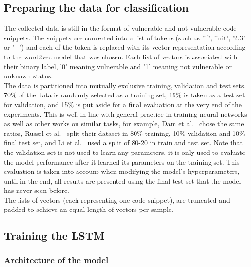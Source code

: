 \documentclass[
a4paper,
pagesize,
pdftex,
12pt,
twoside, %
BCOR=5mm, %
ngerman,
fleqn,
final,
]{scrartcl}
\begin{document}
	\subsection{Preparing the data for classification}
	The collected data is still in the format of vulnerable and not vulnerable code snippets. The snippets are converted into a list of tokens (such as 'if', 'init', '2.3' or '+') and each of the token is replaced with its vector representation according to the word2vec model that was chosen. Each list of vectors is associated with their binary label, '0' meaning vulnerable and '1' meaning not vulnerable or unknown status.\\
	The data is partitioned into mutually exclusive training, validation and test sets. 70\% of the data is randomly selected as a training set, 15\% is taken as a test set for validation, and 15\% is put aside for a final evaluation at the very end of the experiments. This is well in line with general practice in training neural networks as well as other works on similar tasks, for example, Dam et al.~\cite{Dam.2016} chose the same ratios, Russel et al.~\cite{Russell.2018} split their dataset in 80\% training, 10\% validation and 10\% final test set, and Li et al.~\cite{Li.2018} used a split of 80-20 in train and test set. Note that the validation set is not used to learn any parameters, it is only used to evaluate the model performance after it learned its parameters on the training set. This evaluation is taken into account when modifying the model's hyperparameters, until in the end, all results are presented using the final test set that the model has never seen before.\\
	The lists of vectors (each representing one code snippet), are truncated and padded to achieve an equal length of vectors per sample.
	
	\subsection{Training the LSTM}
	
	\subsubsection{Architecture of the model}
	
\end{document}
